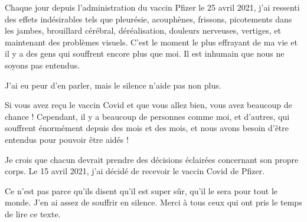 Chaque jour depuis l'administration du vaccin Pfizer le 25 avril 2021, j'ai
ressenti des effets indésirables tels que pleurésie, acouphènes, frissons,
picotements dans les jambes, brouillard cérébral, déréalisation, douleurs
nerveuses, vertiges, et maintenant des problèmes visuels. C'est le moment le
plus effrayant de ma vie et il y a des gens qui souffrent encore plus que
moi. Il est inhumain que nous ne soyons pas entendus.

J'ai eu peur d'en parler, mais le silence n'aide pas non plus.

Si vous avez reçu le vaccin Covid et que vous allez bien, vous avez beaucoup de
chance ! Cependant, il y a beaucoup de personnes comme moi, et d'autres, qui
souffrent énormément depuis des mois et des mois, et nous avons besoin d'être
entendus pour pouvoir être aidés !

Je crois que chacun devrait prendre des décisions éclairées concernant son
propre corps. Le 15 avril 2021, j'ai décidé de recevoir le vaccin Covid de
Pfizer.

Ce n'est pas parce qu'ils disent qu'il est super sûr, qu'il le sera pour tout le
monde. J'en ai assez de souffrir en silence. Merci à tous ceux qui ont pris le
temps de lire ce texte.
